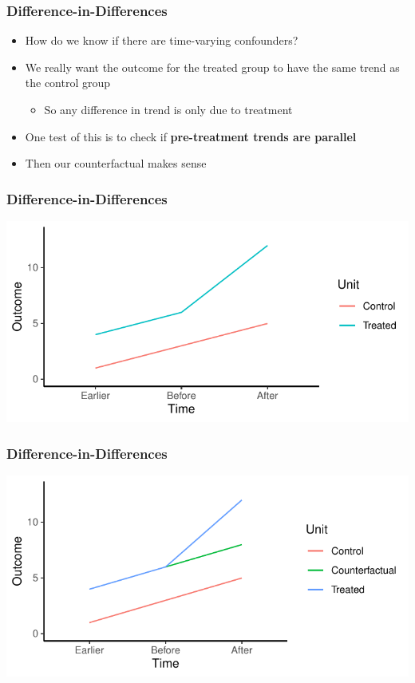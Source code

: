 \documentclass[xcolor=x11names,compress]{beamer}\usepackage[]{graphicx}\usepackage[]{xcolor}
\makeatletter
\def\maxwidth{ %
  \ifdim\Gin@nat@width>\linewidth
    \linewidth
  \else
    \Gin@nat@width
  \fi
}
\newenvironment{knitrout}{}{} %
\renewcommand{\(}{\begin{columns}}
\renewcommand{\)}{\end{columns}}
\newcommand{\<}[1]{\begin{column}{#1}}
\renewcommand{\>}{\end{column}}
\makeatother
\begin{document}
\begin{frame}
\frametitle{Difference-in-Differences}
\begin{itemize}
\item How do we know if there are time-varying confounders?
\pause
\item We really want the outcome for the treated group to have the same trend as the control group
\pause
\begin{itemize}
\item So any difference in trend is only due to treatment
\pause
\end{itemize}
\item One test of this is to check if \textbf{pre-treatment trends are parallel}
\pause
\item Then our counterfactual makes sense
\end{itemize}
\end{frame}

\begin{frame}
\frametitle{Difference-in-Differences}
\begin{knitrout}
\color{fgcolor}
\includegraphics[width=\maxwidth]{figure/DinD_chart6-1} 
\end{knitrout}
\end{frame}

\begin{frame}
\frametitle{Difference-in-Differences}
\begin{knitrout}
\color{fgcolor}
\includegraphics[width=\maxwidth]{figure/DinD_chart7-1} 
\end{knitrout}
\end{frame}
\end{document}
